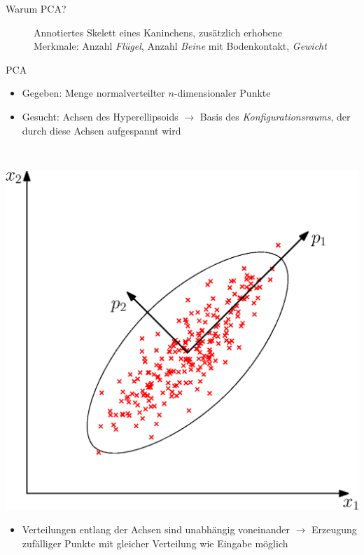 \documentclass{beamer}
\begin{document}
\begin{frame}{Warum PCA?}
{\begin{figure}
   \caption{Annotiertes Skelett eines Kaninchens, zusätzlich erhobene Merkmale: Anzahl \emph{Flügel}, Anzahl \emph{Beine} mit Bodenkontakt, \emph{Gewicht}}
  \end{figure}
 }
\end{frame}

\begin{frame}{PCA}
 \begin{minipage}{0.6\textwidth}
   \begin{itemize}
    \item Gegeben: Menge normalverteilter $n$-dimensionaler Punkte
    \item Gesucht: Achsen des Hyperellipsoids $\rightarrow$ Basis des \emph{Konfigurationsraums}, der durch diese Achsen aufgespannt wird
  \end{itemize}
 \end{minipage}~
 \begin{minipage}{0.4\textwidth}
  \includegraphics[width=\textwidth]{graphics/pca}
 \end{minipage}
 
 \begin{itemize}
  \item Verteilungen entlang der Achsen sind unabhängig voneinander $\rightarrow$ Erzeugung zufälliger Punkte mit gleicher Verteilung wie Eingabe möglich
 \end{itemize}
\end{frame}
\end{document}
